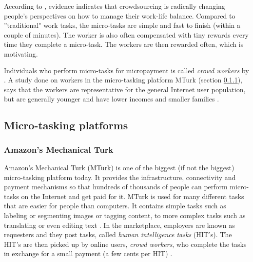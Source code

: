 According to \cite{Deng2016a}, evidence indicates that crowdsourcing is radically changing people's perspectives on how to manage their work-life balance. Compared to ''traditional" work tasks, the micro-tasks are simple and fast to finish (within a couple of minutes). The worker is also often compensated with tiny rewards every time they complete a micro-task. The workers are then rewarded often, which is motivating. 

Individuals who perform micro-tasks for micropayment is called \textit{crowd workers} by \citep{Deng2016a}. A study done on workers in the micro-tasking platform MTurk (section \ref{sec:mturk}), says that the workers are representative for the general Internet user population, but are generally younger and have lower incomes and smaller families \citep{Ipeirotis2010}.  

\subsection{Micro-tasking platforms}


\subsubsection[MTurk]{Amazon's Mechanical Turk}\label{sec:mturk}
Amazon's Mechanical Turk (MTurk) is one of the biggest (if not the biggest) micro-tasking platform today. It provides the infrastructure, connectivity and payment mechanisms so that hundreds of thousands of people can perform micro-tasks on the Internet and get paid for it. MTurk is used for many different tasks that are easier for people than computers. It contains simple tasks such as labeling or segmenting images or tagging content, to more complex tasks such as translating or even editing text \citep{Franklin2011}.  In the marketplace, employers are known as requesters and they post tasks, called \textit{human intelligence tasks} (HIT's). The HIT's are then picked up by online users, \textit{crowd workers}, who complete the tasks in exchange for a small payment (a few cents per HIT) \citep{Ipeirotis2010}. 


